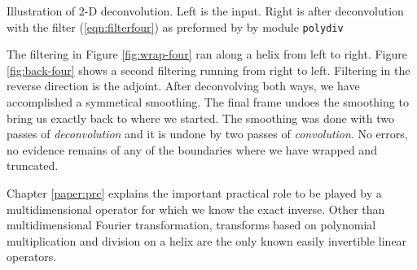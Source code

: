  { 
  Illustration of 2-D deconvolution.
  Left is the input.
  Right is after deconvolution with
  the filter (\protect\ref{eqn:filterfour})
  as preformed by
  by module
  \texttt{polydiv} %
}

The filtering in Figure \ref{fig:wrap-four}
ran along a helix from left to right.
Figure \ref{fig:back-four}
shows a second filtering running from right to left.
Filtering in the reverse direction is the adjoint.
After deconvolving both ways, we have accomplished a symmetical smoothing.
The final frame undoes the smoothing to bring us exactly back
to where we started.
The smoothing was done with two passes of {\it deconvolution}
and it is undone by two passes of {\it convolution}.
No errors, no evidence remains of any of the boundaries
where we have wrapped and truncated.


\par
Chapter \ref{paper:prc} explains the important practical role
to be played by a multidimensional operator for which
we know the exact inverse.  
Other than multidimensional Fourier transformation,
transforms based on polynomial multiplication and division
on a helix are the only known easily invertible linear operators.



